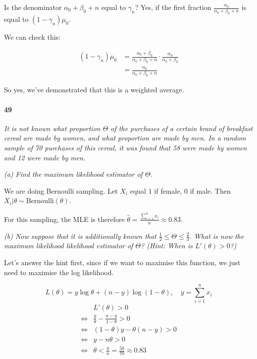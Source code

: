 \documentclass[a4paper]{article}
\begin{document}
                Is the denominator $\alpha_0 + \beta_0 + n$ equal to $\gamma_n$?
                Yes, if the first fraction $\frac{\alpha_0}{\alpha_0 + \beta_0 +
                n}$ is equal to $(1 - \gamma_n)\mu_0$.

                We can check this:

                \begin{align*}
                    (1 - \gamma_n)\mu_0 & = \frac{\alpha_0 + \beta_0}{\alpha_0 +
                        \beta_0 + n} \cdot \frac{\alpha_0}{\alpha_0 + \beta_0}\\
                    & = \frac{\alpha_0}{\alpha_0 + \beta_0 + n}
                \end{align*}

                So yes, we've demonstrated that this is a weighted average.

            \paragraph{49}
            \textit{It is not known what proportion $\Theta$ of the purchases of
            a certain brand of breakfast cereal are made by women, and what
            proportion are made by men. In a random sample of 70 purchases of
            this cereal, it was found that 58 were made by women and 12 were
            made by men.}

            \textit{(a) Find the maximum likelihood estimator of $\Theta$.}

                We are doing Bernoulli sampling. Let $X_i$ equal $1$ if female,
                $0$ if male. Then $X_i | \theta \sim \text{Bernoulli}(\theta)$.

                For this sampling, the MLE is therefore $\widehat \theta =
                \frac{\sum\limits_{i=1}^n x_i}{n} \approx 0.83$.

            \textit{(b) Now suppose that it is additionally known that
            $\frac{1}{2} \leq \Theta \leq \frac{2}{3}$. What is now the maximum
            likelihood likelihood estimator of $\Theta$? (Hint: When is
            $L'(\theta) > 0$?)}

                Let's answer the hint first, since if we want to maximise this
                function, we just need to maximise the log likelihood.

                \[
                    L(\theta) = y\log\theta + (n - y)\log(1 - \theta), \quad y =
                    \sum_{i=1}^n x_i
                \]
                \begin{align*}
                    & L'(\theta) > 0 \\
                    \iff & \frac{y}{\theta} - \frac{n - y}{1 - \theta} > 0 \\
                    \iff & (1 - \theta)y - \theta(n - y) > 0 \\
                    \iff & y - n\theta > 0 \\
                    \iff & \theta < \frac{y}{n} = \frac{58}{70} \approx 0.83
                \end{align*}
\end{document}
